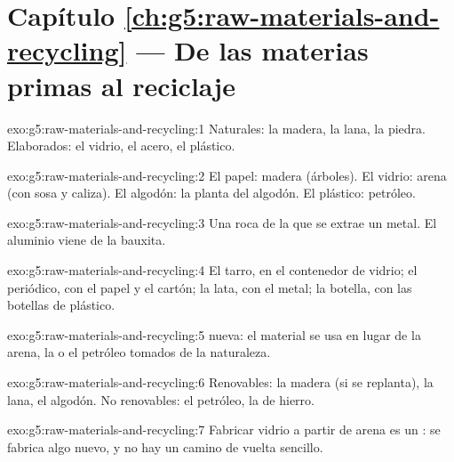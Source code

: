 \section*{Capítulo \ref{ch:g5:raw-materials-and-recycling} --- De las materias primas al reciclaje}

\begin{solution}{exo:g5:raw-materials-and-recycling:1}
Naturales: la madera, la lana, la piedra. Elaborados: el vidrio, el
acero, el plástico.
\end{solution}

\begin{solution}{exo:g5:raw-materials-and-recycling:2}
El papel: madera (árboles). El vidrio: arena (con sosa y caliza). El
algodón: la planta del algodón. El plástico: petróleo.
\end{solution}

\begin{solution}{exo:g5:raw-materials-and-recycling:3}
Una roca de la que se extrae un metal. El aluminio viene de la bauxita.
\end{solution}

\begin{solution}{exo:g5:raw-materials-and-recycling:4}
El tarro, en el contenedor de vidrio; el periódico, con el papel y el
cartón; la lata, con el metal; la botella, con las botellas de plástico.
\end{solution}

\begin{solution}{exo:g5:raw-materials-and-recycling:5}
 nueva: el material  se usa en lugar de la arena,
la  o el petróleo tomados de la naturaleza.
\end{solution}

\begin{solution}{exo:g5:raw-materials-and-recycling:6}
Renovables: la madera (si se replanta), la lana, el algodón. No
renovables: el petróleo, la  de hierro.
\end{solution}

\begin{solution}{exo:g5:raw-materials-and-recycling:7}
Fabricar vidrio a partir de arena es un : se fabrica algo
nuevo, y no hay un camino de vuelta sencillo.
\end{solution}

